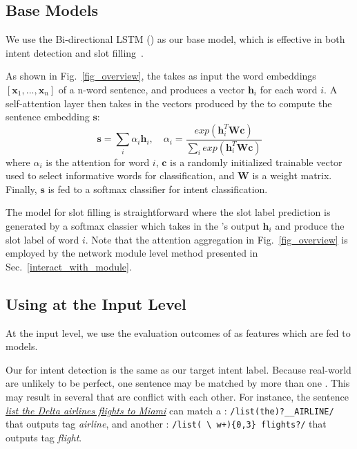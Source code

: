 \subsection{Base Models}
We use the Bi-directional LSTM (\BLSTM) as our base \NN model, which is effective in both intent detection and slot
filling~\cite{liu2016attention}.

 As shown in Fig.~\ref{fig_overview}, the \BLSTM takes as input the word embeddings $[\textbf{x}_1, ...,
\textbf{x}_n]$ of a n-word sentence, and produces a vector $\textbf{h}_i$ for each word $i$. A self-attention layer then takes in the
vectors produced by the \BLSTM to compute the sentence embedding $\textbf{s}$:
\begin{equation}
\textbf{s} = \sum_{i}{\alpha_i\textbf{h}_i}, \quad \alpha_i=\frac{exp(\textbf{h}_i^T\textbf{Wc})}{\sum_{i}{exp(\textbf{h}_i^T\textbf{Wc})}}
\label{eq:simple_att}
\end{equation}
where  $\alpha_i$ is the attention for word $i$, $\textbf{c}$ is a randomly initialized trainable vector used to select informative words for classification, and $\textbf{W}$ is a weight matrix.
Finally, $\textbf{s}$ is fed to a softmax classifier for intent classification.

 The model for slot filling is  straightforward where the slot label prediction is generated by a softmax
classier which takes in the \BLSTM's output $\textbf{h}_i$ and produce the slot label of word $i$. Note that the attention
aggregation in Fig.~\ref{fig_overview} is employed by the network module level method presented in Sec.~\ref{interact_with_module}.


\subsection{Using \REs at the Input Level}
\label{fusion_with_input}
At the input level, we use the evaluation outcomes of \REs as features which are fed to \NN models.

Our \REtag for intent detection is the same as our target intent label.
Because real-world \REs are unlikely to be perfect, one sentence may be matched by more than one \RE. This may result in several \REtags
that are conflict with each other. For instance, the sentence \textsl{\underline{list the Delta airlines flights to Miami}} can match a
\RE: {\small \texttt{/list(\;the)?\;\_\_AIRLINE/}} that outputs tag \emph{airline}, and another \RE: {\small \texttt{/list(\,\textbackslash
w+)\{0,3\} flights?/}} that outputs tag \emph{flight}.

